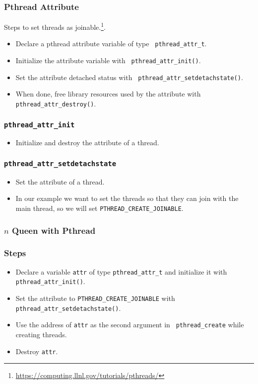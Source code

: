 \documentclass{beamer}
\begin{document}
\begin{frame}
\frametitle{Pthread Attribute} Steps to set threads as
joinable.\footnote{\url{https://computing.llnl.gov/tutorials/pthreads/}}.
\begin{itemize}
\item Declare a pthread attribute variable of type {\tt
  pthread\_attr\_t}.
\item Initialize the attribute variable with {\tt
  pthread\_attr\_init()}.
\item Set the attribute detached status with {\tt
  pthread\_attr\_setdetachstate()}.
\item When done, free library resources used by the attribute with
  {\tt pthread\_attr\_destroy()}.
\end{itemize}
\end{frame}

\begin{frame}
\frametitle{\tt pthread\_attr\_init}
\begin{itemize}
\item Initialize and destroy the attribute of a thread.
\end{itemize}
\end{frame}

\begin{frame}
\frametitle{\tt pthread\_attr\_setdetachstate}
\begin{itemize}
\item Set the attribute of a thread.
\item In our example we want to set the threads so that they can join
  with the main thread, so we will set {\tt PTHREAD\_CREATE\_JOINABLE}.
\end{itemize}
\end{frame}

\begin{frame}
\frametitle{$n$ Queen with Pthread}
\end{frame}

\begin{frame}
\frametitle{Steps}
\begin{itemize}
\item Declare a variable {\tt attr} of type {\tt pthread\_attr\_t}
  and initialize it with {\tt pthread\_attr\_init()}.
\item Set the attribute to {\tt PTHREAD\_CREATE\_JOINABLE} with {\tt
  pthread\_attr\_setdetachstate()}.
\item Use the address of {\tt attr} as the second argument in {\tt
  pthread\_create} while creating threads.
\item Destroy {\tt attr}.
\end{itemize}
\end{frame}
\end{document}
